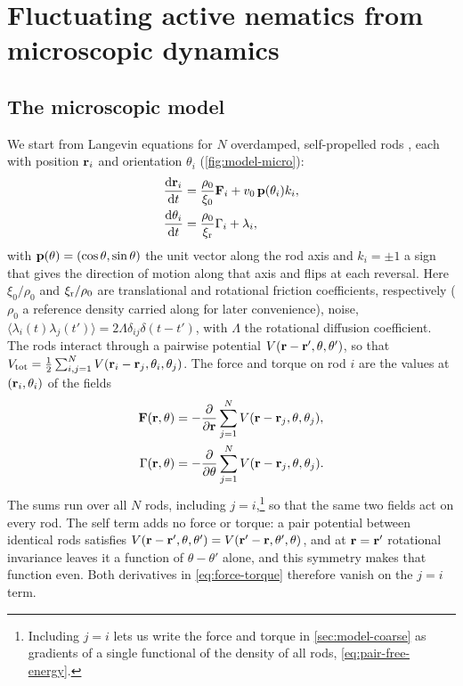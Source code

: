 \documentclass[aps,pre,reprint,superscriptaddress,longbibliography,nofootinbib
]{revtex4-2}
\begin{document}
\section{Fluctuating active nematics from microscopic dynamics}
\label{sec:model}

\subsection{The microscopic model}
\label{sec:model-micro}
We start from Langevin equations for $N$ overdamped,
self-propelled rods
\cite{baskaran2008hydrodynamics,grossmann2016mesoscale},
each with position $\mathbf{r}_i$ and orientation $\theta_i$
(\cref{fig:model-micro}):
\begin{subequations}
  \label{eq:model}
\begin{align}
    \label{eq:langevin-position}
    \frac{\mathrm{d}\mathbf{r}_i}{\mathrm{d} t} &= \frac{\rho_0}{\xi_0}\mathbf{F}_i + v_0\,\mathbf{p}(\theta_i) k_i,
    \\
    \label{eq:langevin-angle}
    \frac{\mathrm{d}\theta_i}{\mathrm{d} t} &= \frac{\rho_0}{\xi_{\rm r}}\Gamma_i + \lambda_i,
\end{align}
\end{subequations}
with $\mathbf{p}(\theta)=(\cos\theta,\sin\theta)$ the unit vector
along the rod axis and $k_i=\pm1$ a sign that gives the
direction of motion along that axis and flips at each
reversal. Here $\xi_0/\rho_0$ and $\xi_{\rm r}/\rho_0$
are translational and rotational friction coefficients,
respectively ($\rho_0$ a reference density carried along
for later convenience),
noise,
$\langle\lambda_i(t)\lambda_j(t')\rangle
=2\Lambda\delta_{ij}\delta(t-t')$, with $\Lambda$ the
rotational diffusion coefficient. The rods interact through
a pairwise potential $V(\mathbf{r}-\mathbf{r}',\theta,\theta')$, so that
$V_\mathrm{tot}=\tfrac12\sum_{i,j=1}^N
V(\mathbf{r}_i-\mathbf{r}_j,\theta_i,\theta_j)$. The force and torque on
rod $i$ are the values at $(\mathbf{r}_i,\theta_i)$ of the fields
\begin{align}
    \label{eq:force-torque}
    \mathbf{F}(\mathbf{r},\theta) &= -\frac{\partial }{\partial \mathbf{r}}\sum_{j=1}^N V(\mathbf{r}-\mathbf{r}_j,\theta,\theta_j),
    \nonumber\\
    \Gamma(\mathbf{r},\theta) &= -\frac{\partial }{\partial \theta}\sum_{j=1}^N V(\mathbf{r}-\mathbf{r}_j,\theta,\theta_j).
\end{align}
The sums run over all $N$ rods, including
$j=i$,\footnote{Including $j=i$ lets us write the force and
torque in \cref{sec:model-coarse} as gradients of a single
functional of the density of all rods,
\cref{eq:pair-free-energy}.} so that the same two fields
act on every rod. The self term adds no force or torque: a
pair potential between identical rods satisfies
$V(\mathbf{r}-\mathbf{r}',\theta,\theta')=V(\mathbf{r}'-\mathbf{r},\theta',\theta)$, and at
$\mathbf{r}=\mathbf{r}'$ rotational invariance leaves it a function of
$\theta-\theta'$ alone, and this symmetry makes that
function even. Both derivatives in
\cref{eq:force-torque} therefore vanish on the $j=i$ term.
\end{document}
